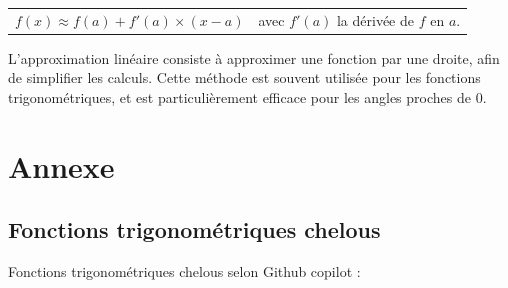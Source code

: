 \documentclass[a4paper]{article}
\begin{document}
			\begin{tabular}{ll}
				\large{$f(x) \approx f(a) + f'(a) \times (x - a)$} & \large{avec $f'(a)$ la dérivée de $f$ en $a$.}\\
			
			\end{tabular}
			
			L'approximation linéaire consiste à approximer une fonction par une droite, 
			afin de simplifier les calculs. Cette méthode est souvent utilisée pour les fonctions trigonométriques,
			et est particulièrement efficace pour les angles proches de $0$.

\newpage

	\section{Annexe}

		\subsection*{Fonctions trigonométriques chelous} \label{fonction_trigo_chelous}

		Fonctions trigonométriques chelous selon Github copilot :
\end{document}
